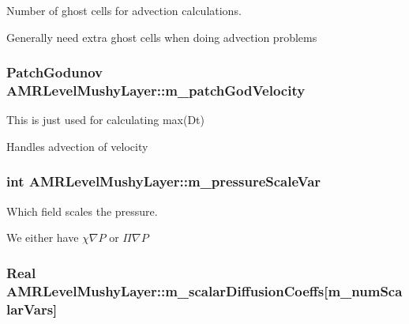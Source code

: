 Number of ghost cells for advection calculations. 

Generally need extra ghost cells when doing advection problems \hypertarget{class_a_m_r_level_mushy_layer_a90acda5f43d2b66e4bcbd989f9354b1b}{
\subsubsection[{m\-\_\-patch\-God\-Velocity}]{\setlength{\rightskip}{0pt plus 5cm}Patch\-Godunov A\-M\-R\-Level\-Mushy\-Layer\-::m\-\_\-patch\-God\-Velocity\hspace{0.3cm}{\ttfamily [protected]}}}\label{class_a_m_r_level_mushy_layer_a90acda5f43d2b66e4bcbd989f9354b1b}


This is just used for calculating max(\-Dt) 

Handles advection of velocity \hypertarget{class_a_m_r_level_mushy_layer_a53408b847afbe94238f1f19daf166f2f}{
\subsubsection[{m\-\_\-pressure\-Scale\-Var}]{\setlength{\rightskip}{0pt plus 5cm}int A\-M\-R\-Level\-Mushy\-Layer\-::m\-\_\-pressure\-Scale\-Var\hspace{0.3cm}{\ttfamily [protected]}}}\label{class_a_m_r_level_mushy_layer_a53408b847afbe94238f1f19daf166f2f}


Which field scales the pressure. 

We either have $ \chi \nabla P $ or $ \Pi \nabla P $ \hypertarget{class_a_m_r_level_mushy_layer_afb12e6063552f8629a5d81fbac6ac20b}{
\subsubsection[{m\-\_\-scalar\-Diffusion\-Coeffs}]{\setlength{\rightskip}{0pt plus 5cm}Real A\-M\-R\-Level\-Mushy\-Layer\-::m\-\_\-scalar\-Diffusion\-Coeffs\mbox{[}m\-\_\-num\-Scalar\-Vars\mbox{]}\hspace{0.3cm}{\ttfamily [protected]}}}\label{class_a_m_r_level_mushy_layer_afb12e6063552f8629a5d81fbac6ac20b}



